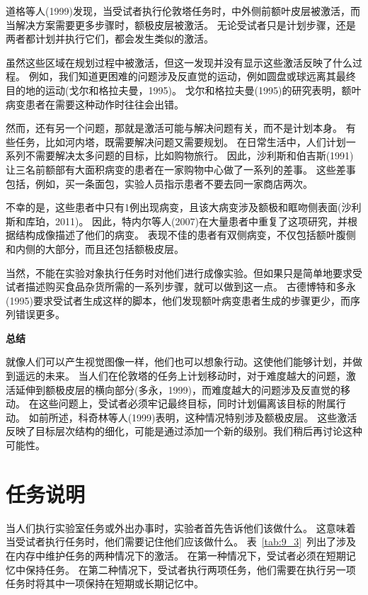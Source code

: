 道格等人(1999)发现，当受试者执行伦敦塔任务时，中外侧前额叶皮层被激活，而当解决方案需要更多步骤时，额极皮层被激活。
无论受试者只是计划步骤，还是两者都计划并执行它们，都会发生类似的激活。
\par


虽然这些区域在规划过程中被激活，但这一发现并没有显示这些激活反映了什么过程。
例如，我们知道更困难的问题涉及反直觉的运动，例如圆盘或球远离其最终目的地的运动(戈尔和格拉夫曼，1995)。
戈尔和格拉夫曼(1995)的研究表明，额叶病变患者在需要这种动作时往往会出错。
\par


然而，还有另一个问题，那就是激活可能与解决问题有关，而不是计划本身。
有些任务，比如河内塔，既需要解决问题又需要规划。
在日常生活中，人们计划一系列不需要解决太多问题的目标，比如购物旅行。
因此，沙利斯和伯吉斯(1991)让三名前额部有大面积病变的患者在一家购物中心做了一系列的差事。
这些差事包括，例如，买一条面包，实验人员指示患者不要去同一家商店两次。
\par


不幸的是，这些患者中只有1例出现病变，且该大病变涉及额极和眶吻侧表面(沙利斯和库珀，2011)。
因此，特内尔等人(2007)在大量患者中重复了这项研究，并根据结构成像描述了他们的病变。
表现不佳的患者有双侧病变，不仅包括额叶腹侧和内侧的大部分，而且还包括额极皮层。
\par


当然，不能在实验对象执行任务时对他们进行成像实验。但如果只是简单地要求受试者描述购买食品杂货所需的一系列步骤，就可以做到这一点。
古德博特和多永(1995)要求受试者生成这样的脚本，他们发现额叶病变患者生成的步骤更少，而序列错误更多。
\par


\textbf{总结}

就像人们可以产生视觉图像一样，他们也可以想象行动。这使他们能够计划，并做到遥远的未来。
当人们在伦敦塔的任务上计划移动时，对于难度越大的问题，激活延伸到额极皮层的横向部分(多永，1999)，而难度越大的问题涉及反直觉的移动。
在这些问题上，受试者必须牢记最终目标，同时计划偏离该目标的附属行动。
如前所述，科奇林等人(1999)表明，这种情况特别涉及额极皮层。
这些激活反映了目标层次结构的细化，可能是通过添加一个新的级别。我们稍后再讨论这种可能性。



\section{任务说明}
\par

当人们执行实验室任务或外出办事时，实验者首先告诉他们该做什么。
这意味着当受试者执行任务时，他们需要记住他们应该做什么。
表~\ref{tab:9_3}~列出了涉及在内存中维护任务的两种情况下的激活。
在第一种情况下，受试者必须在短期记忆中保持任务。
在第二种情况下，受试者执行两项任务，他们需要在执行另一项任务时将其中一项保持在短期或长期记忆中。



